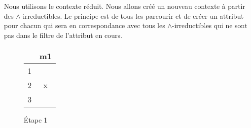 Nous utilisons le contexte réduit. Nous allons créé un nouveau contexte à partir des $\wedge$-irreductibles. Le principe est de tous les parcourir et de créer un attribut pour chacun qui sera en correspondance avec tous les $\wedge$-irreductibles qui ne sont pas dans le filtre de l'attribut en cours.

\begin{figure}[H]
	\begin{minipage}[c]{0.5\textwidth}
	\begin{center}
		\begin{tabular}{ l | c }
			 & m1\\
			\hline
			1 & \\
			2 & x \\
			3 & \\
		\end{tabular}
	\end{center}
	\end{minipage}
	\begin{minipage}[c]{0.5\textwidth}
	\begin{center}
	\end{center}
	\end{minipage}
	\caption{Étape 1}
\end{figure}


